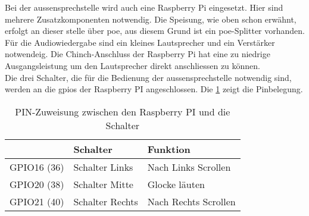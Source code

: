 Bei der \gls{aussensprechstelle} wird auch eine Raspberry Pi eingesetzt. Hier sind mehrere Zusatzkomponenten notwendig. Die Speisung, wie oben schon erwähnt, erfolgt an dieser stelle über \gls{poe}, aus diesem Grund ist ein \gls{poe}-Splitter vorhanden.
\\
Für die Audiowiedergabe sind ein kleines Lautsprecher und ein Verstärker notwendeig. Die Chinch-Anschluss der Raspberry Pi hat eine zu niedrige Ausgangsleistung um den Lautsprecher direkt anschliessen zu können. 
\\
Die drei Schalter, die für die Bedienung der \gls{aussensprechstelle} notwendig sind, werden an die \gls{gpio}s der Raspberry PI angeschlossen. Die \cref{tbl:pinroutesdoor} zeigt die Pinbelegung.
\begin{table}[]
	\centering
	\label{my-label}
	\begin{tabular}{l|ll}
		\multicolumn{1}{r|}{} \textbf{Pi GPIO (PIN)} & \textbf{Schalter} & \textbf{Funktion} \hspace{60pt}	\\ \hline
		GPIO16 (36)	&	Schalter Links		&	Nach Links Scrollen	\\ \hline
		GPIO20 (38)	&	Schalter Mitte		&	Glocke läuten		\\ \hline
		GPIO21 (40)	&	Schalter Rechts		&	Nach Rechts Scrollen		\\ \hline
	\end{tabular}
	\caption{PIN-Zuweisung zwischen den Raspberry PI und die Schalter}
	\label{tbl:pinroutesdoor}
\end{table}

